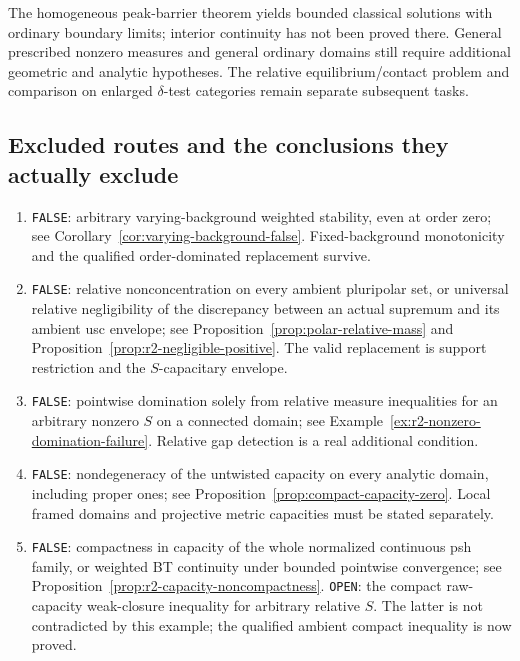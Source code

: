 \documentclass[11pt,a4paper]{article}
\numberwithin{equation}{section}
\theoremstyle{definition}
\theoremstyle{remark}
\begin{document}
The homogeneous peak-barrier theorem yields bounded classical
solutions with ordinary boundary limits; interior continuity has not
been proved there. General prescribed nonzero measures and general
ordinary domains still require additional geometric and analytic
hypotheses. The relative equilibrium/contact problem and comparison
on enlarged $\delta$-test categories remain separate subsequent tasks.

\subsection{Excluded routes and the conclusions they actually exclude}

\begin{enumerate}
\item \texttt{FALSE}: arbitrary varying-background weighted stability,
even at order zero; see
Corollary~\ref{cor:varying-background-false}. Fixed-background
monotonicity and the qualified order-dominated replacement survive.

\item \texttt{FALSE}: relative nonconcentration on every ambient
pluripolar set, or universal relative negligibility of the discrepancy
between an actual supremum and its ambient usc envelope; see
Proposition~\ref{prop:polar-relative-mass} and
Proposition~\ref{prop:r2-negligible-positive}. The valid replacement
is support restriction and the $S$-capacitary envelope.

\item \texttt{FALSE}: pointwise domination solely from relative
measure inequalities for an arbitrary nonzero $S$ on a connected
domain; see Example~\ref{ex:r2-nonzero-domination-failure}.
Relative gap detection is a real additional condition.

\item \texttt{FALSE}: nondegeneracy of the untwisted capacity on every
analytic domain, including proper ones; see
Proposition~\ref{prop:compact-capacity-zero}. Local framed domains
and projective metric capacities must be stated separately.

\item \texttt{FALSE}: compactness in capacity of the whole normalized
continuous psh family, or weighted BT continuity under bounded
pointwise convergence; see
Proposition~\ref{prop:r2-capacity-noncompactness}.
\texttt{OPEN}: the compact raw-capacity weak-closure inequality for
arbitrary relative $S$. The latter is not contradicted by this example;
the qualified ambient compact inequality is now proved.


\end{enumerate}
\end{document}

